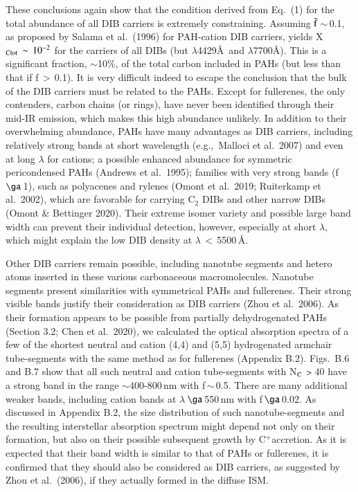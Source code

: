 \documentclass{aa}
\begin{document}
These conclusions again show that the condition derived from Eq.\ 
(1) for the total abundance of all DIB carriers is extremely constraining. Assuming ${\rm \bar{f}}$\,$\sim$\,0.1, as proposed by Salama et al.\ (1996) for PAH-cation DIB carriers, yields X$_{\rm Ctot}\,\sim\,10^{-2}$ for the carriers of all DIBs (but $\lambda$4429\AA\ and $\lambda$7700\AA). This is a significant fraction, $\sim$10\%, of the total carbon included in PAHs (but less than that if f\,$>$\,0.1). It is very difficult indeed to escape the conclusion that the bulk of the DIB carriers must be related to the PAHs. Except for fullerenes, the only contenders, carbon chains 
(or rings), have never been identified through their mid-IR emission, which makes this high abundance unlikely. In addition to their overwhelming abundance, PAHs have many advantages as DIB carriers, including relatively strong bands at short wavelength (e.g.,\ Malloci et al.\ 2007) and even at long $\lambda$ for cations; a possible enhanced abundance for symmetric pericondensed PAHs  (Andrews et al.\ 1995); families with very strong bands (f\,$\ga$\,1), such as polyacenes and rylenes (Omont et al.\ 2019; Ruiterkamp et al.\ 2002), which are favorable for carrying C$_2$ DIBs and other narrow DIBs (Omont \& Bettinger 2020). Their extreme isomer variety and possible large band width can prevent their individual detection, however, especially at 
short $\lambda$, which might explain the low DIB density at $\lambda\,<$\,5500\,\AA .

Other DIB carriers remain possible, including nanotube segments and hetero atoms inserted in these various carbonaceous macromolecules. Nanotube segments present similarities with symmetrical PAHs and fullerenes. Their strong visible bands justify their consideration as DIB carriers (Zhou et al.\ 2006).  As their formation appears to be possible from partially 
dehydrogenated PAHs (Section 3.2; Chen et al.\ 2020), we calculated the optical absorption spectra of a few of the shortest neutral and cation (4,4) and (5,5) hydrogenated armchair tube-segments with the same method as for fullerenes (Appendix B.2). Figs.\ B.6 and B.7 show that all such neutral and cation tube-segments with N$_{\rm C}\,>$\,40 have a strong band in the range $\sim$400-800\,nm with f\,$\sim$\,0.5. There are many 
additional weaker bands, including cation bands at $\lambda$\,$\ga$\,550\,nm with f\,$\ga$\,0.02.  As discussed in Appendix B.2, the size distribution of  such nanotube-segments and the resulting interstellar absorption spectrum might depend not only on their formation, but also on their possible subsequent growth by C$^+$accretion. 
 As it is  expected that their band width is similar to that of PAHs or fullerenes, it is confirmed that they should also be considered as DIB carriers, as suggested by Zhou et al.\ (2006), if they actually formed in the diffuse ISM.
\end{document}
